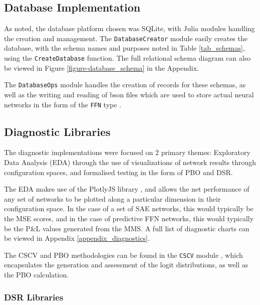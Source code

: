 \documentclass[a4paper,11pt,oneside]{article}
\theoremstyle{plain}
\theoremstyle{definition}
\begin{document}
	\subsection{Database Implementation}\label{software_database}
	
	As noted, the database platform chosen was SQLite, with Julia modules handling the creation and management. The \texttt{DatabaseCreator} module \citep{DCDatabaseCreator} easily creates the database, with the schema names and purposes noted in Table \ref{tab_schemas}, using the \texttt{CreateDatabase} function. The full relational schema diagram can also be viewed in Figure \ref{figure-database_schema} in the Appendix. \newline
	
	The \texttt{DatabaseOps} module \citep{DCDatabaseOps} handles the creation of records for these schemas, as well as the writing and reading of bson files which are used to store actual neural networks in the form of the \texttt{FFN} type \citep{DCFFN}.
	
	\subsection{Diagnostic Libraries}
	
	The diagnostic implementations were focused on 2 primary themes: Exploratory Data Analysis (EDA) through the use of visualizations of network results through configuration spaces, and formalised testing in the form of PBO and DSR.\newline
	
	The EDA makes use of the PlotlyJS library \citep{PlotlyJS}, and allows the net performance of any set of networks to be plotted along a particular dimension in their configuration space. In the case of a set of SAE networks, this would typically be the MSE scores, and in the case of predictive FFN networks, this would typically be the P\&L values generated from the MMS. A full list of diagnostic charts can be viewed in Appendix \ref{appendix_diagnostics}. \newline
	
	The CSCV and PBO methodologies can be found in the \texttt{CSCV} module \citep{DCCSCV}, which encapsulates the generation and assessment of the logit distributions, as well as the PBO calculation.
	
	\subsubsection{DSR Libraries}
	
\end{document}
